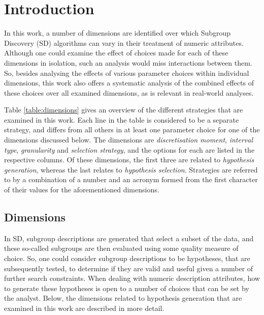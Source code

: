 \documentclass[smallextended]{svjour3}
\newcommand{\dimension}{\emph}
\newcommand{\sd}{SD}
\begin{document}
\section{Introduction}
\label{section:introduction}

In this work, a number of dimensions are identified over which Subgroup Discovery (\sd{}) algorithms can vary in their treatment of numeric attributes.
Although one could examine the effect of choices made for each of these dimensions in isolation, such an analysis would miss interactions between them.
So, besides analysing the effects of various parameter choices within individual dimensions, this work also offers a systematic analysis of the combined effects of these choices over all examined dimensions, as is relevant in real-world analyses.

Table \ref{table:dimensions} gives an overview of the different strategies that are examined in this work.
Each line in the table is considered to be a separate strategy, and differs from all others in at least one parameter choice for one of the dimensions discussed below.
The dimensions are \dimension{discretisation moment}, \dimension{interval type}, \dimension{granularity} and \dimension{selection strategy}, and the options for each are listed in the respective columns.
Of these dimensions, the first three are related to \emph{hypothesis generation}, whereas the last relates to \emph{hypothesis selection}.
Strategies are referred to by a combination of a number and an acronym formed from the first character of their values for the aforementioned dimensions.



\subsection{Dimensions}
\label{section:dimensions}

In \sd{}, subgroup descriptions are generated that select a subset of the data, and these so-called subgroups are then evaluated using some quality measure of choice.
So, one could consider subgroup descriptions to be hypotheses, that are subsequently tested, to determine if they are valid and useful given a number of further search constraints.
When dealing with numeric description attributes, how to generate these hypotheses is open to a number of choices that can be set by the analyst.
Below, the dimensions related to hypothesis generation that are examined in this work are described in more detail.
\end{document}
